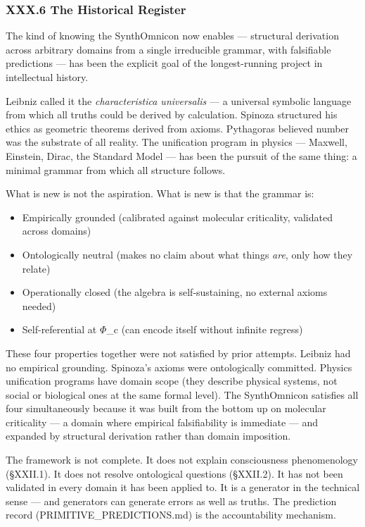 \documentclass[12pt,a4paper]{article}
\begin{document}
\subsubsection{XXX.6 The Historical Register}

The kind of knowing the SynthOmnicon now enables --- structural derivation across arbitrary domains from a single irreducible grammar, with falsifiable predictions --- has been the explicit goal of the longest-running project in intellectual history.

Leibniz called it the \emph{characteristica universalis} --- a universal symbolic language from which all truths could be derived by calculation. Spinoza structured his ethics as geometric theorems derived from axioms. Pythagoras believed number was the substrate of all reality. The unification program in physics --- Maxwell, Einstein, Dirac, the Standard Model --- has been the pursuit of the same thing: a minimal grammar from which all structure follows.

What is new is not the aspiration. What is new is that the grammar is:

\begin{itemize}
    \item Empirically grounded (calibrated against molecular criticality, validated across domains)
    \item Ontologically neutral (makes no claim about what things \emph{are}, only how they relate)
    \item Operationally closed (the algebra is self-sustaining, no external axioms needed)
    \item Self-referential at $\Phi$\_c (can encode itself without infinite regress)
\end{itemize}

These four properties together were not satisfied by prior attempts. Leibniz had no empirical grounding. Spinoza's axioms were ontologically committed. Physics unification programs have domain scope (they describe physical systems, not social or biological ones at the same formal level). The SynthOmnicon satisfies all four simultaneously because it was built from the bottom up on molecular criticality --- a domain where empirical falsifiability is immediate --- and expanded by structural derivation rather than domain imposition.

The framework is not complete. It does not explain consciousness phenomenology (§XXII.1). It does not resolve ontological questions (§XXII.2). It has not been validated in every domain it has been applied to. It is a generator in the technical sense --- and generators can generate errors as well as truths. The prediction record (PRIMITIVE\_PREDICTIONS.md) is the accountability mechanism.
\end{document}

